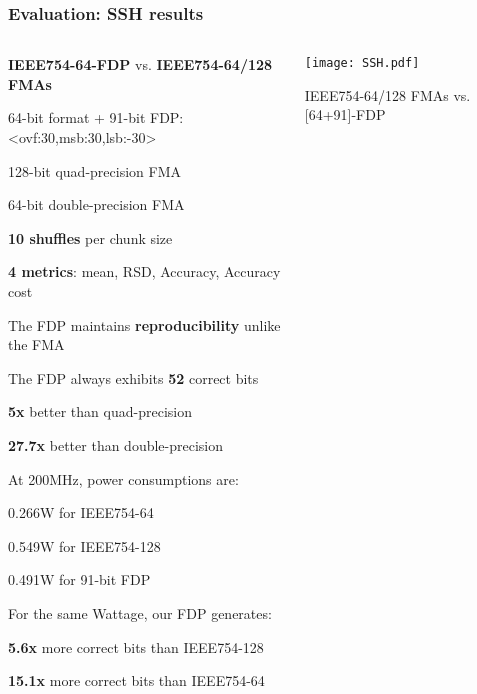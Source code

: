 \begin{frame}
\frametitle{Evaluation: SSH results}

\begin{columns}

\begin{column}{0.5\textwidth}
	\tiny
\begin{myitemize}
	\item<1-> \textbf{IEEE754-64-FDP} vs. \textbf{IEEE754-64/128 FMAs}
	\tiny
    \begin{myitemize}
	\tiny
        \item 64-bit format + 91-bit FDP: <ovf:30,msb:30,lsb:-30>
	\item 128-bit quad-precision FMA
        \item 64-bit double-precision FMA
    \end{myitemize}
	\item<2-> \textbf{10 shuffles} per chunk size
	\item<2-> \textbf{4 metrics}: mean, RSD, Accuracy, Accuracy cost
    \tiny
    \item<3-> The FDP maintains \textbf{reproducibility} unlike the FMA
    \item<3-> The FDP always exhibits \textbf{52} correct bits
    \begin{myitemize}
	\tiny
	\item \textbf{5x} better than quad-precision
	\item \textbf{27.7x} better than double-precision
    \end{myitemize}

	\tiny
    \item<4-> At 200MHz, power consumptions are:
    \begin{myitemize}
	\tiny
        \item 0.266W for IEEE754-64
        \item 0.549W for IEEE754-128
        \item 0.491W for 91-bit FDP
    \end{myitemize}
	\tiny
    \item<5-> For the same Wattage, our FDP generates:
    \begin{myitemize}
	\tiny
	\item \textbf{5.6x} more correct bits than IEEE754-128
	\item \textbf{15.1x} more correct bits than IEEE754-64
    \end{myitemize}
\end{myitemize}
\end{column}

\tiny
\begin{column}{0.5\textwidth}
\centering
\texttt{[image: SSH.pdf]}
\caption{IEEE754-64/128 FMAs vs. [64+91]-FDP}
\end{column}

\end{columns}
\normalsize
\end{frame}

